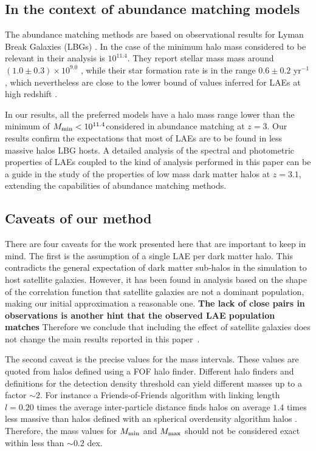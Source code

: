 \documentclass[usenatbib]{mn2e}
\newcommand{\documentname}{paper~}
\newcommand{\hMsun}{{\ifmmode{h^{-1}{\rm
        {M_{\odot}}}}\else{$h^{-1}{\rm{M_{\odot}}}$}\fi}}
\newcommand{\Msun}{{\ifmmode{{\rm {M_{\odot}}}}\else{${\rm{M_{\odot}}}$}\fi}}
\begin{document}
\subsection{In the context of abundance matching models}

The abundance matching methods are based on observational results for
Lyman Break Galaxies (LBGs) \citep{Behroozi2013a,Behroozi2013b}.  In
the case of \cite{Behroozi2013a} the minimum halo mass considered to
be relevant in their analysis is $10^{11.4}$\hMsun. They report
stellar mass mass around $(1.0\pm0.3)\times 10^{9.0}$ \hMsun, while
their star formation rate is in the range $0.6\pm 0.2$ \Msun yr$^{-1}$,
which nevertheless are close to the lower bound of values inferred for
LAEs at high redshift \citep{Gawiser2007,Nilsson2009,Pentericci2009}. 

In our results, all the preferred models have a halo mass range lower
than the minimum of $M_{\rm min}<10^{11.4}$\hMsun considered in
abundance matching at $z=3$. Our results confirm the expectations
that most of  LAEs are to be found in less massive halos LBG hosts. A
detailed analysis of the spectral and photometric properties of LAEs
coupled to the kind of analysis performed in this paper can be a guide
in the study of the properties of low mass dark matter halos at
$z=3.1$, extending the capabilities of abundance matching methods.

\subsection{Caveats of our method}

There are four caveats for the work presented here that are important
to keep in mind. The first is the  
assumption of a single LAE per dark matter halo. This contradicts the
general expectation of dark matter sub-halos in the simulation to host
satellite galaxies. However, it has been found in analysis based on
the shape of the correlation function \citep{Jose2013b} that satellite
galaxies are not a dominant population, making our initial
approximation a reasonable one. {\bf The lack of close pairs in
  observations is another hint that the observed LAE population matches}
Therefore we conclude that including
the effect of satellite galaxies does not change the main results
reported in this \documentname. 

The second caveat is the precise values for the mass intervals. These
values are quoted from halos defined using a FOF halo
finder. Different halo finders and definitions for the detection
density threshold can yield different masses up to a factor $\sim 2$\citep{More2011}. For 
instance a Friends-of-Friends algorithm with linking length $l=0.20$
times the average inter-particle distance finds halos on average $1.4$
times less massive than halos defined  with an spherical overdensity
algorithm halos \citep{Bolshoi}. Therefore, the mass values for
$M_{\rm min}$ and $M_{\rm max}$ should not be considered exact within
less than $\sim 0.2$ dex.   
\end{document}
